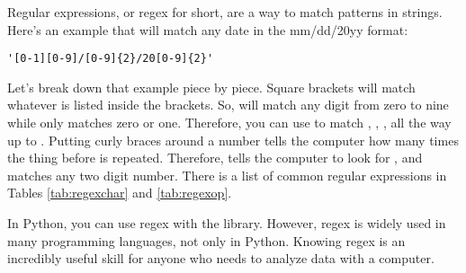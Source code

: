 Regular expressions, or regex for short, are a way to match patterns in strings.  Here's an example that will match any date in the mm/dd/20yy format:
\begin{Verbatim}
'[0-1][0-9]/[0-9]{2}/20[0-9]{2}'
\end{Verbatim}
Let's break down that example piece by piece.  Square brackets \code{[]} will match whatever is listed inside the brackets. So, \code{[0-9]} will match any digit from zero to nine while \code{[0-1]} only matches zero or one.  Therefore, you can use \code{[0-1][0-9]} to match , , , all the way up to .  Putting curly braces \code{\{\}} around a number tells the computer how many times the thing before is repeated. Therefore,  tells the computer to look for , and  matches any two digit number. There is a list of common regular expressions in Tables \ref{tab:regexchar} and \ref{tab:regexop}.

In Python, you can use regex with the  library.  However, regex is widely used in many programming languages, not only in Python. Knowing regex is an incredibly useful skill for anyone who needs to analyze data with a computer.


\vspace{7mm}

